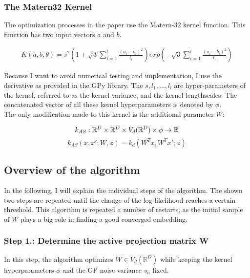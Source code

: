 \subsubsection{The Matern32 Kernel}
The optimization processes in the paper use the Matern-32 kernel function.
This function has two input vectors $a$ and $b$.

\begin{align}
K(a,  b, \theta) = s^2 \left( 1 + \sqrt{3} \sum_{i=1}^l \frac{(a_i - b_i)^2}{ \textit{l}_i} \right) exp\left( - \sqrt{3} \sum_{i=1}^l \frac{(a_i - b_i)^2}{ \textit{l}_i} \right)
\end{align}

Because I want to avoid numerical testing and implementation, I use the derivative as provided in the GPy library.
The $s, l_1, \ldots, l_l $ are hyper-parameters of the kernel, referred to as the kernel-variance, and the kernel-lengthscales. 
The concatenated vector of all these kernel hyperparameters is denoted by $\phi$. \\

The only modification made to this kernel is the additional parameter $W$:

\begin{equation}
k_{AS} : \mathbb{R}^D \times \mathbb{R}^D \times V_d(\mathbb{R}^D) \times \phi \rightarrow \mathbb{R} \\
\end{equation}
\begin{equation}
k_{AS} (x, x'; W, \phi) = k_d(W^T x, W^T x'; \phi)
\end{equation}

\subsection{Overview of the algorithm}

In the following, I will explain the individual steps of the algorithm.
The shown two steps are repeated until the change of the log-likelihood reaches a certain threshold.
This algorithm is repeated a number of restarts, as the initial sample of $W$ plays a big role in finding a good converged embedding.

\subsubsection{Step 1.: Determine the active projection matrix W}
In this step, the algorithm optimizes $W \in V_d(\mathbb{R}^D)$ while keeping the kernel hyperparameters $\phi$ and the GP noise variance $s_n$ fixed.

